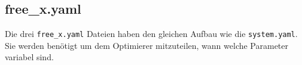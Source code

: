   \subsection{free\_x.yaml} Die drei \texttt{free\_x.yaml} Dateien haben den 
    gleichen Aufbau wie die \texttt{system.yaml}. Sie werden benötigt um dem 
    Optimierer mitzuteilen, wann welche Parameter variabel sind.










%
